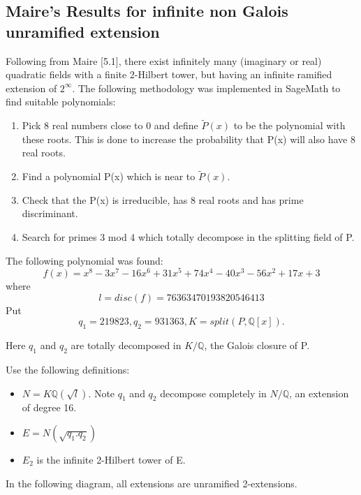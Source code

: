 \documentclass[12pt]{extarticle}
\newcommand{\Q}{\mathbb{Q}}
\newcommand{\<}{\langle}
\renewcommand{\>}{\rangle}
\theoremstyle{definition}
\begin{document}
\subsection{Maire's Results for infinite non Galois unramified extension}
Following from Maire \cite{MAIR}[5.1], there exist infinitely many (imaginary or real) quadratic fields with a finite 2-Hilbert tower, but having an infinite ramified extension of $2^{\infty{}}$. 
The following methodology was implemented in SageMath to find suitable polynomials:
\begin{enumerate}
    \item Pick 8 real numbers close to 0 and define $\tilde{P}(x)$ to be the polynomial with these roots. This is done to increase the probability that P(x) will also have 8 real roots. 
    \item Find a polynomial P(x) which is near to $\tilde{P}(x)$.
    \item Check that the P(x) is irreducible, has 8 real roots and has prime discriminant. 
    \item Search for primes 3 mod 4 which totally decompose in the splitting field of P. 
\end{enumerate}
The following polynomial was found: 
\begin{equation}
    f(x) = x^8 - 3x^7 - 16x^6 + 31x^5 + 74x^4 - 40x^3 - 56x^2 + 17x + 3
\end{equation}
where 
\begin{equation}
    l = disc(f) = 76363470193820546413
\end{equation}
Put \begin{equation}
    q_1 = 219823, q_2 = 931363, K = split(P, \Q[x]).
\end{equation}
\par
Here $q_1$ and $q_2$ are totally decomposed in $K/\Q$, the Galois closure of P.
\par
Use the following definitions: 
\begin{itemize}
    \item $N = K\Q(\sqrt{l})$. Note $q_1$ and $q_2$ decompose completely in $N/\Q$, an extension of degree 16.
    \item $E = N(\sqrt{q_1.q_2})$
    \item $E_2$ is the infinite 2-Hilbert tower of E.
\end{itemize}
\par 
In the following diagram, all extensions are unramified 2-extensions. 
\end{document}
